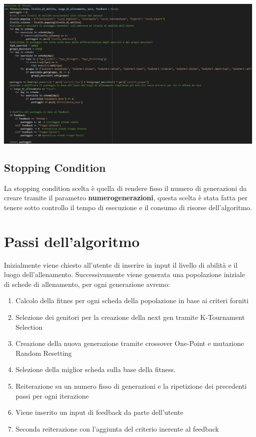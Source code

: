\documentclass{book}
\begin{document}
  \includegraphics[width=1.0\linewidth]{Fitness.png}

  \subsection{Stopping Condition}
  La stopping condition scelta è quella di rendere fisso il numero di generazioni da creare tramite il parametro \textbf{numerogenerazioni}, questa scelta è stata fatta per tenere sotto controllo il tempo di esecuzione e il consumo di risorse dell'algoritmo.


  \section{Passi dell'algoritmo}
  Inizialmente viene chiesto all'utente di inserire in input il livello di abilità e il luogo dell'allenamento. Successivamente viene generata una popolazione iniziale di schede di allenamento, per ogni generazione avremo:
  \begin{enumerate}
      \item Calcolo della fitnes per ogni scheda della popolazione in base ai criteri forniti
      \item Selezione dei genitori per la creazione della next gen tramite K-Tournament Selection
      \item Creazione della nuova generazione tramite crossover One-Point e mutazione Random Resetting 
      \item Selezione della miglior scheda sulla base della fitness.
      \item Reiterazione su un numero fisso di generazioni e la ripetizione dei precedenti passi per ogni iterazione
      \item Viene inserito un input di feedback da parte dell'utente
      \item Seconda reiterazione con l'aggiunta del criterio inerente al feedback
  \end{enumerate}
\end{document}
